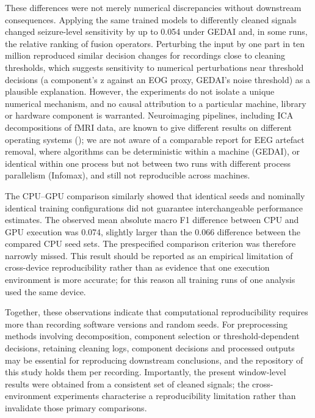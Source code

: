\documentclass[11pt,a4paper]{article}
\begin{document}
These differences were not merely numerical discrepancies without downstream
consequences. Applying the same trained models to differently cleaned signals changed
seizure-level sensitivity by up to 0.054 under GEDAI and, in some runs, the relative
ranking of fusion operators. Perturbing the input by one part in ten million reproduced
similar decision changes for recordings close to cleaning thresholds, which suggests
sensitivity to numerical perturbations near threshold decisions (a component's \textbar z\textbar{}
against an EOG proxy, GEDAI's noise threshold) as a plausible explanation. However, the
experiments do not isolate a unique numerical mechanism, and no causal attribution to a
particular machine, library or hardware component is warranted. Neuroimaging pipelines,
including ICA decompositions of fMRI data, are known to give different results on
different operating systems (\citealp{Glatard_2015}); we are not aware of a comparable report
for EEG artefact removal, where algorithms can be deterministic within a machine
(GEDAI), or identical within one process but not between two runs with different process parallelism (Infomax), and still not reproducible across machines.

The CPU--GPU comparison similarly showed that identical seeds and nominally identical
training configurations did not guarantee interchangeable performance estimates. The
observed mean absolute macro F1 difference between CPU and GPU execution was 0.074,
slightly larger than the 0.066 difference between the compared CPU seed sets. The
prespecified comparison criterion was therefore narrowly missed. This result should be
reported as an empirical limitation of cross-device reproducibility rather than as
evidence that one execution environment is more accurate; for this reason all training
runs of one analysis used the same device.

Together, these observations indicate that computational reproducibility requires more
than recording software versions and random seeds. For preprocessing methods involving
decomposition, component selection or threshold-dependent decisions, retaining cleaning
logs, component decisions and processed outputs may be essential for reproducing
downstream conclusions, and the repository of this study holds them per recording.
Importantly, the present window-level results were obtained from a consistent set of
cleaned signals; the cross-environment experiments characterise a reproducibility
limitation rather than invalidate those primary comparisons.
\end{document}

